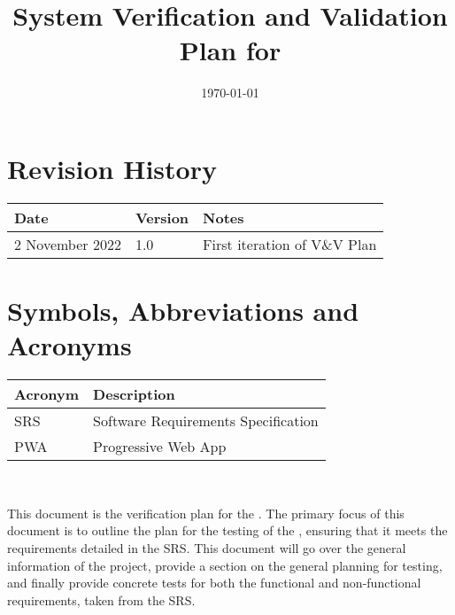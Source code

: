 \documentclass[12pt, titlepage]{article}
\begin{document}
\title{System Verification and Validation Plan for \progname{}} 
\author{\authname}
\date{\today}
	
\maketitle


\section{Revision History}

\begin{tabularx}{\textwidth}{p{3.2cm}p{1.8cm}X}
\toprule {\bf Date} & {\bf Version} & {\bf Notes}\\
\midrule
2 November 2022 & 1.0 & First iteration of V\&V Plan\\
\bottomrule
\end{tabularx}

\newpage

\tableofcontents

\listoftables
{}


\newpage

\section{Symbols, Abbreviations and Acronyms}

\renewcommand{\arraystretch}{1.2}
\begin{tabular}{l l} 
  \toprule		
  \textbf{Acronym} & \textbf{Description}\\
  \midrule 
  SRS & Software Requirements Specification\\
  PWA & Progressive Web App\\
  \bottomrule
\end{tabular}\\



\newpage


This document is the verification plan for the \progname{}. The primary focus of this document is to outline the plan for the testing of the \progname{}, ensuring that it meets the requirements detailed in the SRS. This document will go over the general information of the project, provide a section on the general planning for testing, and finally provide concrete tests for both the functional and non-functional requirements, taken from the SRS. 
\end{document}
